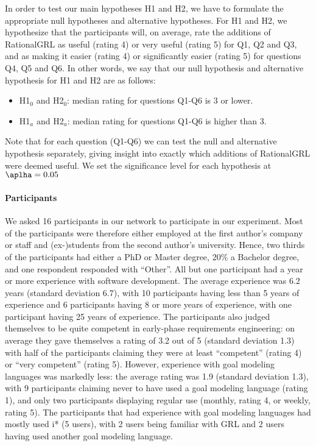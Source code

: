 In order to test our main hypotheses H1 and H2, we have to formulate the appropriate null hypotheses and alternative hypotheses. For H1 and H2, we hypothesize that the participants will, on average, rate the additions of RationalGRL as useful (rating 4) or very useful (rating 5) for Q1, Q2 and Q3, and as making it easier (rating 4) or significantly easier (rating 5) for questions Q4, Q5 and Q6. In other words, we say that our null hypothesis and alternative hypothesis for H1 and H2 are as follows:
\begin{itemize}
\item H1$_{0}$ and H2$_{0}$: median rating for questions Q1-Q6 is 3 or lower.
\item H1$_{a}$ and H2$_{a}$: median rating for questions Q1-Q6 is higher than 3.
\end{itemize}
Note that for each question (Q1-Q6) we can test the null and alternative hypothesis separately, giving insight into exactly which additions of RationalGRL were deemed useful. We set the significance level for each hypothesis at $\aplha = 0.05$

\paragraph{Participants}
We asked 16 participants in our network to participate in our experiment. Most of the participants were therefore either employed at the first author's company or staff and (ex-)students from the second author's university. Hence, two thirds of the participants had either a PhD or Master degree, 20\% a Bachelor degree, and one respondent responded with ``Other''. All but one participant had a year or more experience with software development. The average experience was 6.2 years (standard deviation 6.7), with 10 participants having less than 5 years of experience and 6 participants having 8 or more years of experience, with one participant having 25 years of experience. The participants also judged themselves to be quite competent in  early-phase requirements engineering: on average they gave themselves a rating of 3.2 out of 5 (standard deviation 1.3) with half of the participants claiming they were at least ``competent'' (rating 4) or ``very competent'' (rating 5). However, experience with goal modeling languages was markedly less: the average rating was 1.9 (standard deviation 1.3), with 9 participants claiming never to have used a goal modeling language (rating 1), and only two participants displaying regular use (monthly, rating 4, or weekly, rating 5). The participants that had experience with goal modeling languages had mostly used i* (5 users), with 2 users being familiar with GRL and 2 users having used another goal modeling language.

